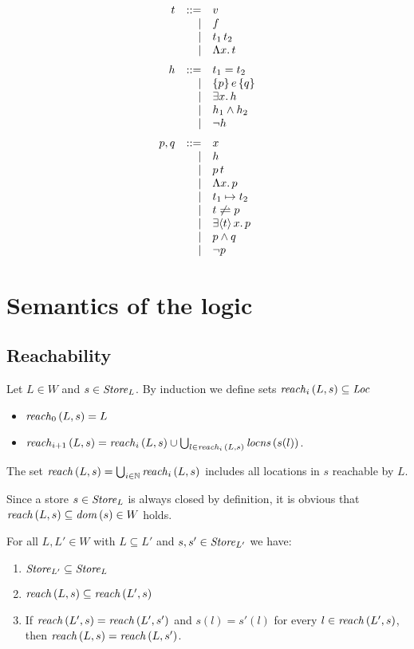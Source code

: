 \documentclass[12pt,a4paper]{report}
\begin{document}
\[\GRbeg
  t \GRis v
    \GRal f
    \GRal \app{t_1}{t_2}
    \GRal \tabstr{x}{t}
    \GRnl

  h \GRis t_1 = t_2
    \GRal \triple{p}{e}{q}
    \GRal \qex{x}{h}
    \GRal h_1 \wedge h_2
    \GRal \neg h
    \GRnl

  p,q \GRis x
      \GRal h
      \GRal \app{p}{t}
      \GRal \tabstr{x}{p}
      \GRal t_1 \mapsto t_2
      \GRal t \not\rightleftharpoons p
      \GRal \qbex{x}{t}{p}
      \GRal p \wedge q
      \GRal \neg p
\GRend\]



\section{Semantics of the logic}



\subsection{Reachability}

\begin{definition}[Reachability]
  Let $L\in W$ and $s\in\mathit{Store}_L$. By induction we define sets $\mathit{reach}_{i}\,(L,s) \subseteq \mathit{Loc}$
  \begin{itemize}
    \item $\mathit{reach}_{0}\,(L,s) = L$
    \item $\mathit{reach}_{i+1}\,(L,s) = \mathit{reach}_{i}\,(L,s) \cup \bigcup_{l\in\mathit{reach}_{i}\,(L,s)} \mathit{locns}\,(s(l))$.
  \end{itemize}
  The set $\mathit{reach}\,(L,s) = \bigcup_{i\in\mathbb N} \mathit{reach}_{i}\,(L,s)$ includes all locations in $s$ reachable
  by $L$.
\end{definition}

Since a store $s\in\mathit{Store}_L$ is always closed by definition, it is obvious that
$\mathit{reach}\,(L,s) \subseteq \mathit{dom}\,(s) \in  W$ holds.

\begin{lemma}
  For all $L,L'\in W$ with $L \subseteq L'$ and $s,s'\in\mathit{Store}_{L'}$ we have:
  \begin{enumerate}
    \item $\mathit{Store}_{L'} \subseteq \mathit{Store}_L$
    \item $\mathit{reach}\,(L,s) \subseteq \mathit{reach}\,(L',s)$
    \item If $\mathit{reach}\,(L',s) = \mathit{reach}\,(L',s')$ and $s(l) = s'(l)$ for every $l\in\mathit{reach}\,(L',s)$,
          then $\mathit{reach}\,(L,s) = \mathit{reach}\,(L,s')$.
  \end{enumerate}
\end{lemma}
\end{document}
